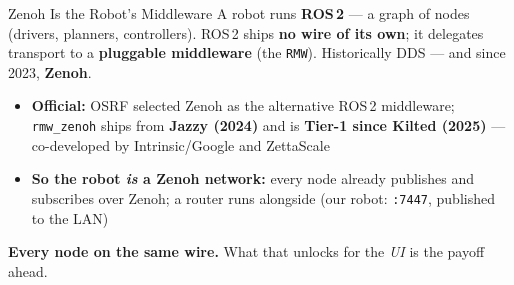 \documentclass[9pt]{beamer}
\begin{document}
\begin{frame}{Zenoh Is the Robot's Middleware}
  A robot runs \textbf{ROS\,2} --- a graph of nodes (drivers, planners, controllers). ROS\,2 ships \textbf{no wire of its own}; it delegates transport to a \textbf{pluggable middleware} (the \texttt{RMW}). Historically DDS --- and since 2023, \textbf{Zenoh}.

  \vspace{0.4em}
  \begin{itemize}
    \item \textbf{Official:} OSRF selected Zenoh as the alternative ROS\,2 middleware; \texttt{rmw\_zenoh} ships from \textbf{Jazzy (2024)} and is \textbf{Tier-1 since Kilted (2025)} --- co-developed by Intrinsic/Google and ZettaScale
    \item \textbf{So the robot \emph{is} a Zenoh network:} every node already publishes and subscribes over Zenoh; a router runs alongside (our robot: \texttt{:7447}, published to the LAN)
  \end{itemize}

  \vspace{0.5em}
  \textbf{Every node on the same wire.} What that unlocks for the \emph{UI} is the payoff ahead.
\end{frame}
\end{document}
